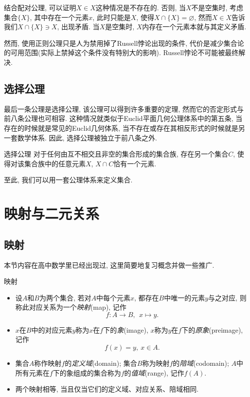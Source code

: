 结合配对公理, 可以证明$X \in X$这种情况是不存在的. 否则, 当$X$不是空集时, 考虑集合$\{ X\}$, 其中存在一个元素$x$, 此时只能是$X$, 使得$X \cap \{ X\}=\varnothing$, 然而$X \in X$告诉我们$X \cap \{ X\} \ni X$, 出现矛盾. 当$X$是空集时, $X$内存在一个元素本就与其定义矛盾.

然而, 使用正则公理只是人为禁用掉了Russell悖论出现的条件, 代价是减少集合论的可用范围(实际上禁掉这个条件没有特别大的影响). Russell悖论不可能被最终解决.

\subsection{选择公理}

最后一条公理是选择公理, 该公理可以得到许多重要的定理, 然而它的否定形式与前八条公理也可相容. 这种情况就类似于Euclid平面几何公理体系中的第五条, 当存在的时候就是常见的Euclid几何体系, 当不存在或存在其相反形式的时候就是另一套数学体系. 因此, 选择公理被独立于前八条之外. 

\begin{axiom}{选择公理}
	对于任何由互不相交且非空的集合形成的集合族, 存在另一个集合$C$, 使得对该集合族中的任意元素$X$, $X \cap C$恰有一个元素.
\end{axiom}

至此, 我们可以用一套公理体系来定义集合. 

\newpage
\section{映射与二元关系}

\subsection{映射}

本节内容在高中数学里已经出现过, 这里简要地复习概念并做一些推广.

\begin{definition}{映射}
	\vspace{-2em}
	\begin{itemize}
		\item 设$A$和$B$为两个集合, 若对$A$中每个元素$x$, 都存在$B$中唯一的元素$y$与之对应, 则称此对应关系为一个\textit{映射}(map), 记作$$f: A \to B, ~~x \mapsto y.$$
		\item $x$在$B$中的对应元素$y$称为$x$在$f$下的\textit{象}(image), $x$称为$y$在$f$下的\textit{原象}(preimage), 记作$$f(x) = y, ~ x \in A.$$
		\item 集合$A$称作映射$f$的\textit{定义域}(domain); 集合$B$称为映射$f$的\textit{陪域}(codomain); $A$中所有元素在$f$下的象组成的集合称为$f$的\textit{值域}(range), 记作$f(A)$.
		\item 两个映射相等, 当且仅当它们的定义域、对应关系、陪域相同.
	\end{itemize}
\end{definition}

